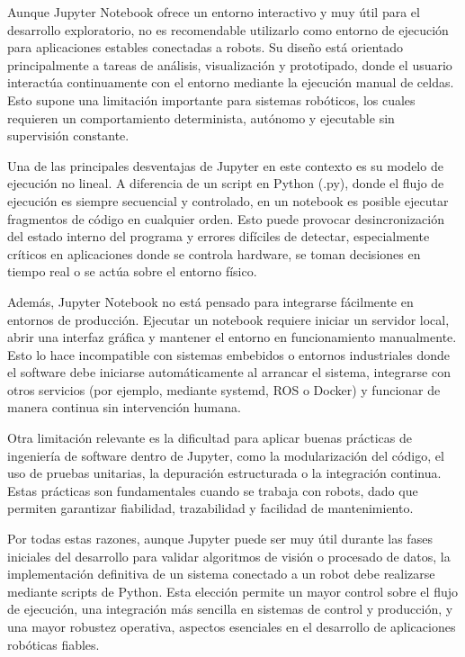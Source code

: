 Aunque Jupyter Notebook ofrece un entorno interactivo y muy útil para el desarrollo exploratorio, no es recomendable utilizarlo como entorno de ejecución para aplicaciones estables conectadas a robots. Su diseño está orientado principalmente a tareas de análisis, visualización y prototipado, donde el usuario interactúa continuamente con el entorno mediante la ejecución manual de celdas. Esto supone una limitación importante para sistemas robóticos, los cuales requieren un comportamiento determinista, autónomo y ejecutable sin supervisión constante.

Una de las principales desventajas de Jupyter en este contexto es su modelo de ejecución no lineal. A diferencia de un script en Python (.py), donde el flujo de ejecución es siempre secuencial y controlado, en un notebook es posible ejecutar fragmentos de código en cualquier orden. Esto puede provocar desincronización del estado interno del programa y errores difíciles de detectar, especialmente críticos en aplicaciones donde se controla hardware, se toman decisiones en tiempo real o se actúa sobre el entorno físico.

Además, Jupyter Notebook no está pensado para integrarse fácilmente en entornos de producción. Ejecutar un notebook requiere iniciar un servidor local, abrir una interfaz gráfica y mantener el entorno en funcionamiento manualmente. Esto lo hace incompatible con sistemas embebidos o entornos industriales donde el software debe iniciarse automáticamente al arrancar el sistema, integrarse con otros servicios (por ejemplo, mediante systemd, ROS o Docker) y funcionar de manera continua sin intervención humana.

Otra limitación relevante es la dificultad para aplicar buenas prácticas de ingeniería de software dentro de Jupyter, como la modularización del código, el uso de pruebas unitarias, la depuración estructurada o la integración continua. Estas prácticas son fundamentales cuando se trabaja con robots, dado que permiten garantizar fiabilidad, trazabilidad y facilidad de mantenimiento.

Por todas estas razones, aunque Jupyter puede ser muy útil durante las fases iniciales del desarrollo para validar algoritmos de visión o procesado de datos, la implementación definitiva de un sistema conectado a un robot debe realizarse mediante scripts de Python. Esta elección permite un mayor control sobre el flujo de ejecución, una integración más sencilla en sistemas de control y producción, y una mayor robustez operativa, aspectos esenciales en el desarrollo de aplicaciones robóticas fiables.







